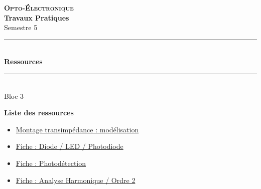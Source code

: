 \documentclass[a4paper,11pt]{article} %
\begin{document}
{\begin{center}
\begin{minipage}{10cm}
\begin{center}
	\end{center}
\end{minipage}\hfill


\vspace{2cm}


{\Large \bfseries \textsc{Opto-Électronique}} \\[0.5cm]
{\large \bfseries Travaux Pratiques} \\[0.2cm]
Semestre 5

\vspace{1cm}

\rule{\linewidth}{0.3mm} \\[0.4cm]
{ \Large \bfseries\color{violet_iogs} Ressources \\[0.4cm] }
\rule{\linewidth}{0.3mm} \\[1cm]
{\large Bloc 3}

\end{center}

\vspace{3cm}

\textbf{\large Liste des ressources}
\begin{itemize}
	\item \hyperref[ressource:ModeleTrans]{Montage transimpédance : modélisation}
	\item \hyperref[fiche:Led]{Fiche : Diode / LED / Photodiode}
	\item \hyperref[fiche:Photodetect]{Fiche : Photodétection}
	\item \hyperref[fiche:AnHaOrdre2]{Fiche : Analyse Harmonique / Ordre 2}
\end{itemize}

\vfill

\newpage
\strut %






}
\end{document}
